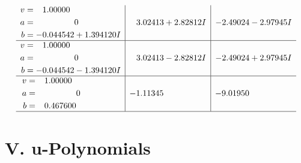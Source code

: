 \documentclass[1p]{elsarticle_modified}
\theoremstyle{definition}
\begin{document}
$$\begin{array}{c|c|c}
\begin{aligned}
v &= \phantom{-}1.00000\phantom{ +0.000000I} \\
a &= \phantom{-0.000000 } 0 \\
b &= -0.044542 + 1.394120 I\end{aligned}
 & \phantom{-}3.02413 + 2.82812 I & -2.49024 - 2.97945 I \\ \hline\begin{aligned}
v &= \phantom{-}1.00000\phantom{ +0.000000I} \\
a &= \phantom{-0.000000 } 0 \\
b &= -0.044542 - 1.394120 I\end{aligned}
 & \phantom{-}3.02413 - 2.82812 I & -2.49024 + 2.97945 I \\ \hline\begin{aligned}
v &= \phantom{-}1.00000\phantom{ +0.000000I} \\
a &= \phantom{-0.000000 } 0 \\
b &= \phantom{-}0.467600\phantom{ +0.000000I}\end{aligned}
 & -1.11345\phantom{ +0.000000I} & -9.01950\phantom{ +0.000000I}\\
 \hline 
 \end{array}$$\newpage
\newpage\renewcommand{\arraystretch}{1}
\centering \section*{ V. u-Polynomials}
\end{document}
